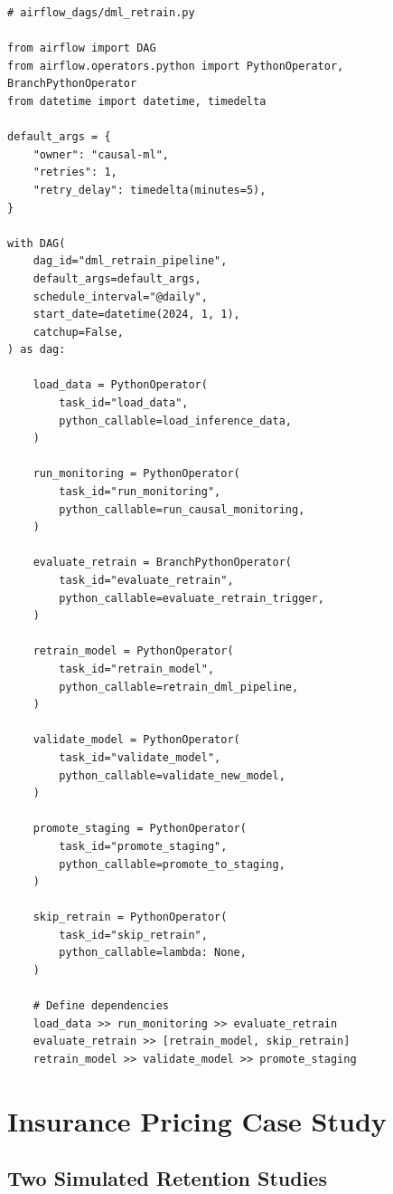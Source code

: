\begin{verbatim}
# airflow_dags/dml_retrain.py

from airflow import DAG
from airflow.operators.python import PythonOperator, BranchPythonOperator
from datetime import datetime, timedelta

default_args = {
    "owner": "causal-ml",
    "retries": 1,
    "retry_delay": timedelta(minutes=5),
}

with DAG(
    dag_id="dml_retrain_pipeline",
    default_args=default_args,
    schedule_interval="@daily",
    start_date=datetime(2024, 1, 1),
    catchup=False,
) as dag:

    load_data = PythonOperator(
        task_id="load_data",
        python_callable=load_inference_data,
    )

    run_monitoring = PythonOperator(
        task_id="run_monitoring",
        python_callable=run_causal_monitoring,
    )

    evaluate_retrain = BranchPythonOperator(
        task_id="evaluate_retrain",
        python_callable=evaluate_retrain_trigger,
    )

    retrain_model = PythonOperator(
        task_id="retrain_model",
        python_callable=retrain_dml_pipeline,
    )

    validate_model = PythonOperator(
        task_id="validate_model",
        python_callable=validate_new_model,
    )

    promote_staging = PythonOperator(
        task_id="promote_staging",
        python_callable=promote_to_staging,
    )

    skip_retrain = PythonOperator(
        task_id="skip_retrain",
        python_callable=lambda: None,
    )

    # Define dependencies
    load_data >> run_monitoring >> evaluate_retrain
    evaluate_retrain >> [retrain_model, skip_retrain]
    retrain_model >> validate_model >> promote_staging
\end{verbatim}


\section{Insurance Pricing Case Study}\label{sec:insurance_case_study}

\subsection{Two Simulated Retention Studies}

